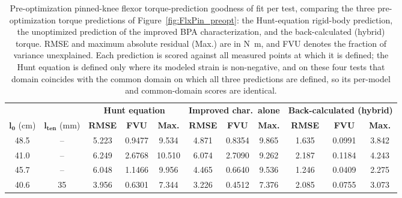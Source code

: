 \begin{table}[H]
\caption{Pre-optimization pinned-knee flexor torque-prediction goodness of fit per test, comparing the three pre-optimization torque predictions of Figure~\ref{fig:FlxPin_preopt}: the Hunt-equation rigid-body prediction, the unoptimized prediction of the improved BPA characterization, and the back-calculated (hybrid) torque. RMSE and maximum absolute residual (Max.) are in \unit{\newton\meter}, and FVU denotes the fraction of variance unexplained. Each prediction is scored against all measured points at which it is defined; the Hunt equation is defined only where its modeled strain is non-negative, and on these four tests that domain coincides with the common domain on which all three predictions are defined, so its per-model and common-domain scores are identical.}
\label{tab:FlxPinPreGof}
\begingroup
\renewcommand{\arraystretch}{1}%
\fontsize{10pt}{12pt}\selectfont
\begin{tabular}{@{}cc ccccccccc@{}}
\toprule
& & \multicolumn{3}{c}{\textbf{Hunt equation}} & \multicolumn{3}{c}{\textbf{Improved char.\ alone}} & \multicolumn{3}{c}{\textbf{Back-calculated (hybrid)}} \\
\cmidrule(lr){3-5} \cmidrule(lr){6-8} \cmidrule(l){9-11}
$\boldsymbol{l_{0}}$ (\unit{\cm}) & $\boldsymbol{l_{\text{ten}}}$ (\unit{\mm}) & \textbf{RMSE} & \textbf{FVU} & \textbf{Max.} & \textbf{RMSE} & \textbf{FVU} & \textbf{Max.} & \textbf{RMSE} & \textbf{FVU} & \textbf{Max.} \\
\midrule
48.5 & -- & 5.223 & 0.9477 & 9.534 & 4.871 & 0.8354 & 9.865 & 1.635 & 0.0991 & 3.842 \\
41.0 & -- & 6.249 & 2.6768 & 10.510 & 6.074 & 2.7090 & 9.262 & 2.187 & 0.1184 & 4.243 \\
45.7 & -- & 6.048 & 1.1466 & 9.956 & 4.465 & 0.6640 & 9.536 & 1.246 & 0.0409 & 2.275 \\
40.6 & 35 & 3.956 & 0.6301 & 7.344 & 3.226 & 0.4512 & 7.376 & 2.085 & 0.0755 & 3.073 \\
\bottomrule
\end{tabular}
\endgroup
\end{table}
